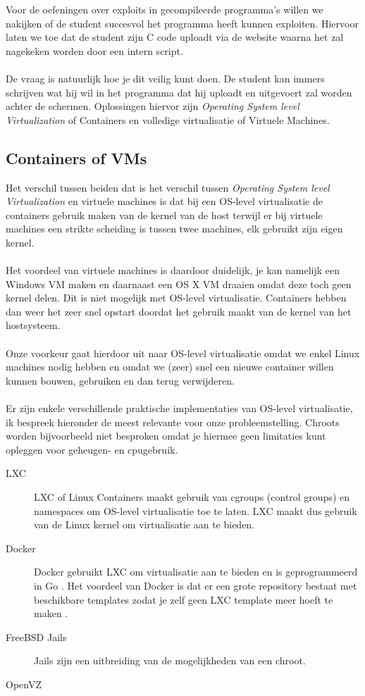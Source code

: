 Voor de oefeningen over exploits in gecompileerde programma's willen we nakijken of de student succesvol het programma heeft kunnen exploiten. Hiervoor laten we toe dat de student zijn C code uploadt via de website waarna het zal nagekeken worden door een intern script.\\
\\
De vraag is natuurlijk hoe je dit veilig kunt doen. De student kan immers schrijven wat hij wil in het programma dat hij uploadt en uitgevoert zal worden achter de schermen. Oplossingen hiervor zijn \emph{Operating System level Virtualization} of Containers en volledige virtualisatie of Virtuele Machines.

\subsection{Containers of VMs}
Het verschil tussen beiden dat is het verschil tussen \emph{Operating System level Virtualization} en virtuele machines is dat bij een OS-level virtualisatie de containers gebruik maken van de kernel van de host terwijl er bij virtuele machines een strikte scheiding is tussen twee machines, elk gebruikt zijn eigen kernel.\\
\\
Het voordeel van virtuele machines is daardoor duidelijk, je kan namelijk een Windows VM maken en daarnaast een OS X VM draaien omdat deze toch geen kernel delen. Dit is niet mogelijk met OS-level virtualisatie. Containers hebben dan weer het zeer snel opstart doordat het gebruik maakt van de kernel van het hostsysteem.\\
\\
Onze voorkeur gaat hierdoor uit naar OS-level virtualisatie omdat we enkel Linux machines nodig hebben en omdat we (zeer) snel een nieuwe container willen kunnen bouwen, gebruiken en dan terug verwijderen.\\
\\
Er zijn enkele verschillende praktische implementaties van OS-level virtualisatie, ik bespreek hieronder de meest relevante voor onze probleemstelling. Chroots worden bijvoorbeeld niet besproken omdat je hiermee geen limitaties kunt opleggen voor geheugen- en cpugebruik.
\begin{description}
\item[LXC] LXC of Linux Containers maakt gebruik van cgroups (control groups) en namespaces om OS-level virtualisatie toe te laten. LXC maakt dus gebruik van de Linux kernel om virtualisatie aan te bieden.
\item[Docker] Docker gebruikt LXC om virtualisatie aan te bieden en is geprogrammeerd in Go \cite{dockergithub}. Het voordeel van Docker is dat er een grote repository bestaat met beschikbare templates zodat je zelf geen LXC template meer hoeft te maken \cite{dockerrepo}.
\item[FreeBSD Jails] Jails zijn een uitbreiding van de mogelijkheden van een chroot. 
\item[OpenVZ]  
\end{description}

